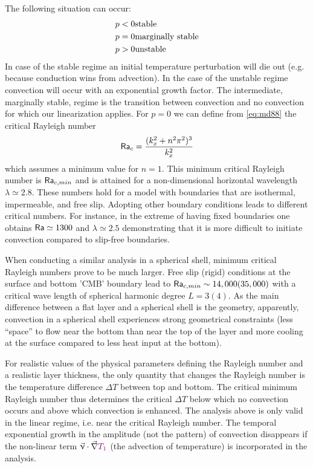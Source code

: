 The following situation can occur:
\begin{eqnarray}
p<0 & \text{stable} \nonumber\\
p=0 & \text{marginally stable} \nonumber\\
p>0 & \text{unstable}  \nonumber
\end{eqnarray}
In case of the stable regime an initial temperature perturbation will die out (e.g. because
conduction wins from advection). In the case of the unstable regime convection will
occur with an exponential growth factor. The intermediate, marginally stable, regime is
the transition between convection and no convection for which our linearization applies.
For $p=0$ we can define from \eqref{eq:md88} the critical Rayleigh number
\begin{equation}
{\mathsf{Ra}}_c = \frac{(k_x^2+n^2\pi^2)^3}{k_x^2}
\end{equation}
which assumes a minimum value for $n=1$. This minimum
critical Rayleigh number is ${\mathsf{Ra}}_{c,min}$ and is attained for a non-dimensional horizontal
wavelength $\lambda \simeq 2.8$. These numbers hold for a model with boundaries that are
isothermal, impermeable, and free slip. Adopting other boundary conditions leads to
different critical numbers. For instance, in the extreme of having fixed boundaries one
obtains ${\mathsf{Ra}} \simeq 1300$ and $\lambda \simeq 2.5$ demonstrating that it is more difficult to initiate
convection compared to slip-free boundaries.

When conducting a similar analysis in a spherical shell, minimum critical Rayleigh
numbers prove to be much larger. Free slip (rigid) conditions at the surface and bottom
'CMB' boundary lead to ${\mathsf{Ra}}_{c,min}\sim 14,000 (35,000)$ with a critical wave length of
spherical harmonic degree $L=3 (4)$. As the main difference between a flat layer and a
spherical shell is the geometry, apparently, convection in a spherical shell experiences
strong geometrical constraints (less “space” to flow near the bottom than near the top of
the layer and more cooling at the surface compared to less heat input at the bottom).

For realistic values of the physical parameters defining the Rayleigh number and a
realistic layer thickness, the only quantity that changes the Rayleigh number is the
temperature difference $\Delta T$ between top and bottom. The critical minimum Rayleigh
number thus determines the critical $\Delta T$ below which no convection occurs and above
which convection is enhanced. The analysis above is only valid in the linear regime, i.e.
near the critical Rayleigh number. The temporal exponential growth in the amplitude (not
the pattern) of convection disappears if the non-linear term $\vec\upnu\cdot\vec\nabla {\color{violet}T_1}$ 
(the advection of temperature) is incorporated in the analysis.

